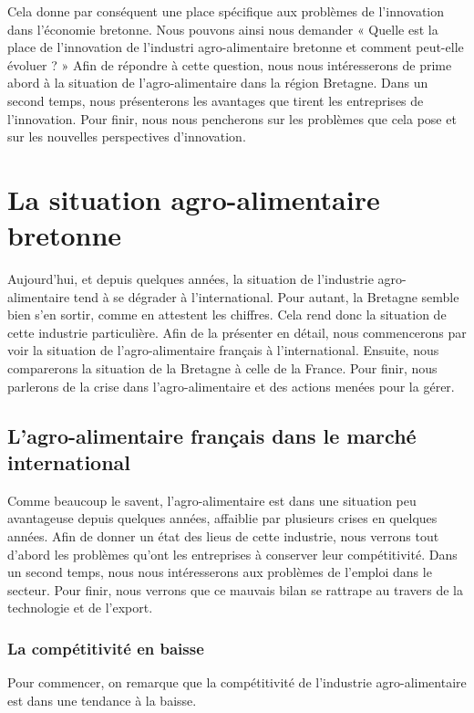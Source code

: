 \documentclass[a4paper,12pt]{report}
\begin{document}
	 Cela donne par conséquent une place spécifique aux problèmes de l'innovation dans l’économie bretonne. Nous pouvons ainsi nous demander « Quelle est la place de l'innovation de l'industri agro-alimentaire bretonne et comment peut-elle évoluer ? » Afin de répondre à cette question, nous nous intéresserons de prime abord à la situation de l’agro-alimentaire dans la région Bretagne. Dans un second temps, nous présenterons les avantages que tirent les entreprises de l'innovation. Pour finir, nous nous pencherons sur les problèmes que cela pose et sur les nouvelles perspectives d'innovation.
	 
\chapter{La situation agro-alimentaire bretonne}
	Aujourd’hui, et depuis quelques années, la situation de l’industrie agro-alimentaire tend à se dégrader à l’international. Pour autant, la Bretagne semble bien s’en sortir, comme en attestent les chiffres. Cela rend donc la situation de cette industrie particulière. Afin de la présenter en détail, nous commencerons par voir la situation de l’agro-alimentaire français à l’international. Ensuite, nous comparerons la situation de la Bretagne à celle de la France. Pour finir, nous parlerons de la crise dans l’agro-alimentaire et des actions menées pour la gérer.

	\section{L’agro-alimentaire français dans le marché international}
		Comme beaucoup le savent, l’agro-alimentaire est dans une situation peu avantageuse depuis quelques années, affaiblie par plusieurs crises en quelques années. Afin de donner un état des lieus de cette industrie, nous verrons tout d’abord les problèmes qu’ont les entreprises à conserver leur compétitivité. Dans un second temps, nous nous intéresserons aux problèmes de l’emploi dans le secteur. Pour finir, nous verrons que ce mauvais bilan se rattrape au travers de la technologie et de l’export.

		\subsection{La compétitivité en baisse}
			Pour commencer, on remarque que la compétitivité de l’industrie agro-alimentaire est dans une tendance à la baisse.
			
\end{document}
